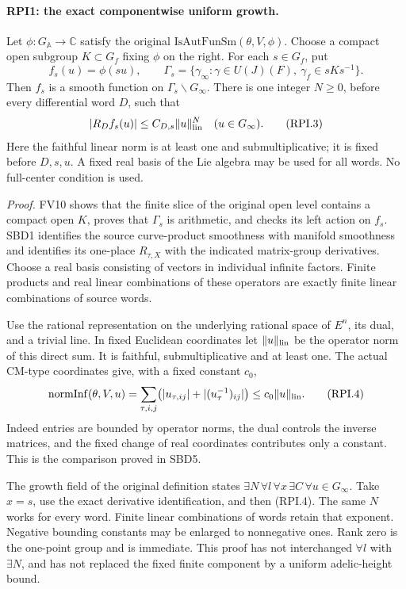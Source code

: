 \paragraph{RPI1: the exact componentwise uniform growth.}
\label{claim:RPI1}
Let \(\phi:G_{\mathbb A}\to\mathbb C\) satisfy the original
\(\mathrm{IsAutFunSm}(\theta,V,\phi)\).  Choose a compact open subgroup
\(K\subset G_f\) fixing \(\phi\) on the right.  For each \(s\in G_f\),
put
\[
 f_s(u)=\phi(su),\qquad
 \Gamma_s=\{\gamma_\infty:\gamma\in U(J)(F),\
                              \gamma_f\in sKs^{-1}\}.
 \tag{RPI.2}
\]
Then \(f_s\) is a smooth function on \(\Gamma_s\backslash G_\infty\).
There is one integer \(N\ge0\), before every differential word \(D\),
such that
\[
       |R_D f_s(u)|\le C_{D,s}\|u\|_{\rm lin}^{N}
                         \quad(u\in G_\infty).
 \tag{RPI.3}
\]
Here the faithful linear norm is at least one and submultiplicative;
it is fixed before \(D,s,u\).  A fixed real basis of the Lie algebra
may be used for all words.  No full-center condition is used.

\emph{Proof.}
FV10 shows that the finite slice of the original open level contains
a compact open \(K\), proves that \(\Gamma_s\) is arithmetic, and
checks its left action on \(f_s\).  SBD1 identifies the source
curve-product smoothness with manifold smoothness and identifies its
one-place \(R_{\tau,X}\) with the indicated matrix-group derivatives.
Choose a real basis consisting of vectors in individual infinite
factors.  Finite products and real linear combinations of these
operators are exactly finite linear combinations of source words.

Use the rational representation on the underlying rational space of
\(E^n\), its dual, and a trivial line.  In fixed Euclidean coordinates
let \(\|u\|_{\rm lin}\) be the operator norm of this direct sum.
It is faithful, submultiplicative and at least one.  The actual
CM-type coordinates give, with a fixed constant \(c_0\),
\[
 \mathrm{normInf}(\theta,V,u)
 =\sum_{\tau,i,j}\bigl(|u_{\tau,ij}|+
                                  |(u_\tau^{-1})_{ij}|\bigr)
 \le c_0\|u\|_{\rm lin}.
 \tag{RPI.4}
\]
Indeed entries are bounded by operator norms, the dual controls the
inverse matrices, and the fixed change of real coordinates contributes
only a constant.  This is the comparison proved in SBD5.

The \(\mathrm{growth}\) field of the original definition states
\(\exists N\,\forall l\,\forall x\,\exists C\,\forall u\in G_\infty\).
Take \(x=s\), use the exact derivative identification, and then
(RPI.4).  The same \(N\) works for every word.  Finite linear
combinations of words retain that exponent.  Negative bounding
constants may be enlarged to nonnegative ones.  Rank zero is the
one-point group and is immediate.  This proof has not interchanged
\(\forall l\) with \(\exists N\), and has not replaced the fixed
finite component by a uniform adelic-height bound.

